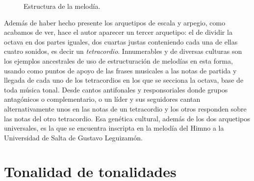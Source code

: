 \begin{figure}[H]
\caption{Estructura de la melodía.}
\label{fig:estructura-melodia}
\end{figure}

Además de haber hecho presente los arquetipos de escala y arpegio, como acabamos de ver, hace el autor aparecer un tercer arquetipo: el de dividir la octava en dos partes iguales, dos cuartas justas conteniendo cada una de ellas cuatro sonidos, es decir un \emph{tetracordio}. Innumerables y de diversas culturas son los ejemplos ancestrales de uso de estructuración de melodías en esta forma, usando como puntos de apoyo de las frases musicales a las notas de partida y llegada de cada uno de los tetracordios en los que se secciona la octava, base de toda música tonal. Desde cantos antifonales y responsoriales donde grupos antagónicos o complementario, o un líder y sus seguidores cantan alternativamente unos en las notas de un tetracordio y los otros responden sobre las notas del otro tetracordio. Esa genética cultural, además de los dos arquetipos universales, es la que se encuentra inscripta en la melodía del Himno a la Universidad de Salta de Gustavo Leguizamón.


\section{Tonalidad de tonalidades}
\label{sec:tonalidad-tonalidades}

